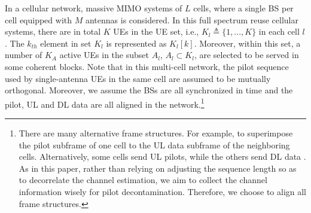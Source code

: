 In a cellular network, massive MIMO systems of $L$ cells, where a single BS per cell equipped 
with $M$ antennas is considered. %
In this full spectrum reuse cellular systems, there are in total $K$ UEs in the UE set, i.e., $K_l\triangleq\{1,...,K\}$ in each cell $l$. The $k_{th}$ element in set $K_l$ is represented as $K_l[k]$. Moreover, within this set, a number of $K_A$ active UEs in the subset $A_l$, $A_l\subset K_l$, are selected to be served in some coherent blocks. Note that in this multi-cell network, the pilot sequence used by single-antenna UEs in the same
cell are assumed to be mutually orthogonal. Moreover, we assume the BSs are all synchronized in time and the pilot, UL and DL data are all aligned in the network.\footnote{There are many alternative frame structures. For example, to superimpose the pilot subframe of one cell to the  UL data subframe of the neighboring cells\cite{upadhya2017superimposed}. Alternatively, some cells send UL pilots, while the others send DL data \cite{fernandes2013inter}. As in this paper, rather than relying on adjusting the sequence length so as to decorrelate the channel estimation, we aim to collect the channel information wisely for pilot decontamination. Therefore, we choose to align all frame structures.} 
